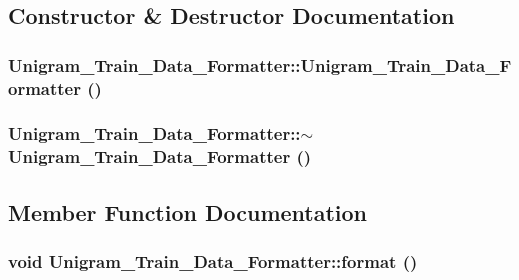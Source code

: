 \subsection{Constructor \& Destructor Documentation}
\hypertarget{class_unigram___train___data___formatter_aa068bb8b734f2401dba5a360120a8f33}{
\subsubsection[{Unigram\_\-Train\_\-Data\_\-Formatter}]{\setlength{\rightskip}{0pt plus 5cm}Unigram\_\-Train\_\-Data\_\-Formatter::Unigram\_\-Train\_\-Data\_\-Formatter ()}}
\label{class_unigram___train___data___formatter_aa068bb8b734f2401dba5a360120a8f33}
\hypertarget{class_unigram___train___data___formatter_ac28f8c1217e864043d34094fde2bcad5}{
\subsubsection[{$\sim$Unigram\_\-Train\_\-Data\_\-Formatter}]{\setlength{\rightskip}{0pt plus 5cm}Unigram\_\-Train\_\-Data\_\-Formatter::$\sim$Unigram\_\-Train\_\-Data\_\-Formatter ()}}
\label{class_unigram___train___data___formatter_ac28f8c1217e864043d34094fde2bcad5}


\subsection{Member Function Documentation}
\hypertarget{class_unigram___train___data___formatter_a36638dccaf14cf8ab597a3f8f0694cfe}{
\subsubsection[{format}]{\setlength{\rightskip}{0pt plus 5cm}void Unigram\_\-Train\_\-Data\_\-Formatter::format ()}}
\label{class_unigram___train___data___formatter_a36638dccaf14cf8ab597a3f8f0694cfe}


